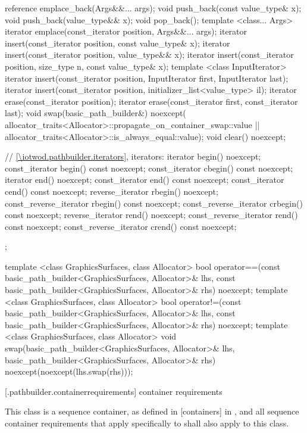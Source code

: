 \begin{codeblock}
{{    reference emplace_back(Args&&... args);
    void push_back(const value_type& x);
    void push_back(value_type&& x);
    void pop_back();
    template <class... Args>
    iterator emplace(const_iterator position, Args&&... args);
    iterator insert(const_iterator position, const value_type& x);
    iterator insert(const_iterator position, value_type&& x);
    iterator insert(const_iterator position, size_type n, const value_type& x);
    template <class InputIterator>
    iterator insert(const_iterator position, InputIterator first, InputIterator last);
    iterator insert(const_iterator position,
    initializer_list<value_type> il);
    iterator erase(const_iterator position);
    iterator erase(const_iterator first, const_iterator last);
    void swap(basic_path_builder&) noexcept(
      allocator_traits<Allocator>::propagate_on_container_swap::value ||
      allocator_traits<Allocator>::is_always_equal::value);
    void clear() noexcept;

    // \ref{\iotwod.pathbuilder.iterators}, iterators:
    iterator begin() noexcept;
    const_iterator begin() const noexcept;
    const_iterator cbegin() const noexcept;
    iterator end() noexcept;
    const_iterator end() const noexcept;
    const_iterator cend() const noexcept;
    reverse_iterator rbegin() noexcept;
    const_reverse_iterator rbegin() const noexcept;
    const_reverse_iterator crbegin() const noexcept;
    reverse_iterator rend() noexcept;
    const_reverse_iterator rend() const noexcept;
    const_reverse_iterator crend() const noexcept;
  };

  template <class GraphicsSurfaces, class Allocator>
  bool operator==(const basic_path_builder<GraphicsSurfaces, Allocator>& lhs,
    const basic_path_builder<GraphicsSurfaces, Allocator>& rhs) noexcept;
  template <class GraphicsSurfaces, class Allocator>
  bool operator!=(const basic_path_builder<GraphicsSurfaces, Allocator>& lhs,
    const basic_path_builder<GraphicsSurfaces, Allocator>& rhs) noexcept;
  template <class GraphicsSurfaces, class Allocator>
  void swap(basic_path_builder<GraphicsSurfaces, Allocator>& lhs,
    basic_path_builder<GraphicsSurfaces, Allocator>& rhs) noexcept(noexcept(lhs.swap(rhs)));
}
\end{codeblock}

 [\iotwod.pathbuilder.containerrequirements] { container requirements}

\pnum
This class is a sequence container, as defined in [containers] in \CppXVII, and all sequence container requirements that apply specifically to  shall also apply to this class.

